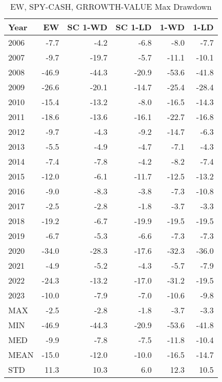 \documentclass{article}
\begin{document}
\begin{table}[!ht]
    \centering
    \caption{EW, SPY-CASH, GRROWTH-VALUE Max Drawdown}
\begin{tabular}{lrrrrr}
\hline
Year & EW & SC 1-WD  & SC 1-LD & 1-WD & 1-LD \\
\hline
2006 & -7.7 & \cellcolor{green!25}-4.2 & -6.8 & \cellcolor{red!25}-8.0 & -7.7 \\
2007 & -9.7 & \cellcolor{red!25}-19.7 & \cellcolor{green!25}-5.7 & -11.1 & -10.1 \\
2008 & -46.9 & -44.3 & \cellcolor{green!25}-20.9 & \cellcolor{red!25}-53.6 & -41.8 \\
2009 & -26.6 & -20.1 & \cellcolor{green!25}-14.7 & -25.4 & \cellcolor{red!25}-28.4 \\
2010 & -15.4 & -13.2 & \cellcolor{green!25}-8.0 & \cellcolor{red!25}-16.5 & -14.3 \\
2011 & -18.6 & \cellcolor{green!25}-13.6 & -16.1 & \cellcolor{red!25}-22.7 & -16.8 \\
2012 & -9.7 & \cellcolor{green!25}-4.3 & -9.2 & \cellcolor{red!25}-14.7 & -6.3 \\
2013 & -5.5 & -4.9 & -4.7 & \cellcolor{red!25}-7.1 & \cellcolor{green!25}-4.3 \\
2014 & -7.4 & -7.8 & \cellcolor{green!25}-4.2 & \cellcolor{red!25}-8.2 & -7.4 \\
2015 & -12.0 & \cellcolor{green!25}-6.1 & -11.7 & -12.5 & \cellcolor{red!25}-13.2 \\
2016 & -9.0 & -8.3 & \cellcolor{green!25}-3.8 & -7.3 & \cellcolor{red!25}-10.8 \\
2017 & -2.5 & -2.8 & \cellcolor{green!25}-1.8 & \cellcolor{red!25}-3.7 & -3.3 \\
2018 & -19.2 & \cellcolor{green!25}-6.7 & \cellcolor{red!25}-19.9 & -19.5 & -19.5 \\
2019 & -6.7 & \cellcolor{green!25}-5.3 & -6.6 & \cellcolor{red!25}-7.3 & \cellcolor{red!25}-7.3 \\
2020 & -34.0 & -28.3 & \cellcolor{green!25}-17.6 & -32.3 & \cellcolor{red!25}-36.0 \\
2021 & -4.9 & -5.2 & \cellcolor{green!25}-4.3 & -5.7 & \cellcolor{red!25}-7.9 \\
2022 & -24.3 & \cellcolor{green!25}-13.2 & -17.0 & \cellcolor{red!25}-31.2 & -19.5 \\
2023 & -10.0 & -7.9 & \cellcolor{green!25}-7.0 & \cellcolor{red!25}-10.6 & -9.8 \\ \hline
MAX & -2.5 & -2.8 & \cellcolor{green!25}-1.8 & \cellcolor{red!25}-3.7 & -3.3 \\
MIN & -46.9 & -44.3 & \cellcolor{green!25}-20.9 & \cellcolor{red!25}-53.6 & -41.8 \\
MED & -9.9 & -7.8 & \cellcolor{green!25}-7.5 & \cellcolor{red!25}-11.8 & -10.4 \\
MEAN & -15.0 & -12.0 & \cellcolor{green!25}-10.0 & \cellcolor{red!25}-16.5 & -14.7 \\
STD & 11.3 & 10.3 & \cellcolor{red!25}6.0 & \cellcolor{green!25}12.3 & 10.5 \\

\hline
\end{tabular}
\end{table}
\end{document}
